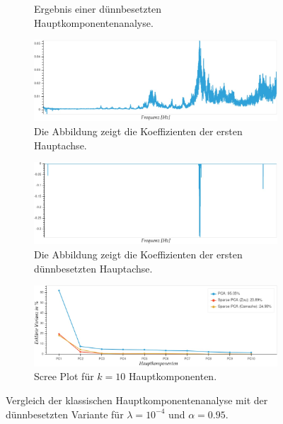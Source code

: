 \begin{figure}
\begin{subfigure}{0.45\textwidth}
\caption{Ergebnis einer dünnbesetzten Hauptkomponentenanalyse.}
\label{sparse_pca_classical_analysis_sparse_pc_graph}
\end{subfigure}
\vspace{0.5cm}
%
\begin{subfigure}{0.9\textwidth}
\centering
\includegraphics[width=\textwidth]{figures/Signal_5_principal_axis.jpg}
\caption{Die Abbildung zeigt die Koeffizienten der ersten Hauptachse.}
\label{sparse_pca_classical_analysis_principal_axis}
\end{subfigure}
\vspace{0.5cm}
%
\begin{subfigure}{0.9\textwidth}
\centering
\includegraphics[width=\textwidth]{figures/Signal_5_sparse_principal_axis.jpg}
\caption{Die Abbildung zeigt die Koeffizienten der ersten dünnbesetzten Hauptachse.}
\label{sparse_pca_classical_analysis_sparse_principal_axis}
\end{subfigure}
%
\begin{subfigure}{0.9\textwidth}
\centering
\includegraphics[width = \textwidth]{figures/Signal_5_scree_plot_10.jpg}
\caption{Scree Plot für $k=10$ Hauptkomponenten.}
\label{sparse_pca_classical_analysis_scree_plot}
\end{subfigure}
\caption{Vergleich der klassischen Hauptkomponentenanalyse mit der dünnbesetzten Variante für $\lambda=10^{-4}$ und $\alpha = 0.95$.}
\label{sparse_pca_classical_analysis}
\end{figure}


